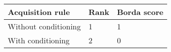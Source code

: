 \begin{tabular}{lll}
Acquisition rule & Rank & Borda score \\ 
\hline 
Without conditioning & 1 & 1 \\ 
With conditioning & 2 & 0 \\ 
\hline 
\end{tabular}
